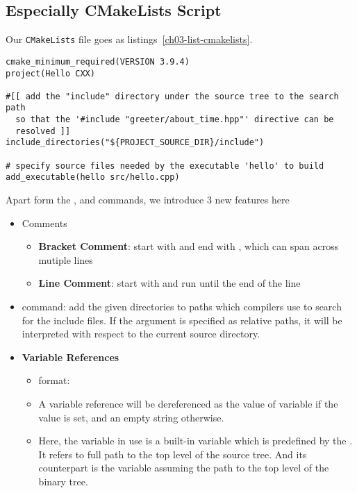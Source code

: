 \subsection{Especially CMakeLists Script}
Our \texttt{CMakeLists} file goes as listings~\ref{ch03-list-cmakelists}.\par
\begin{lstlisting}[caption={Codes for \texttt{CMakeLists.txt}},label=ch03-list-cmakelists]
cmake_minimum_required(VERSION 3.9.4)
project(Hello CXX)

#[[ add the "include" directory under the source tree to the search path
  so that the '#include "greeter/about_time.hpp"' directive can be
  resolved ]]
include_directories("${PROJECT_SOURCE_DIR}/include")

# specify source files needed by the executable 'hello' to build
add_executable(hello src/hello.cpp)
\end{lstlisting}
Apart form the ,  and  commands, we introduce 3 new features here
\begin{itemize}
	\item Comments
    \begin{itemize}
      \item \textbf{Bracket Comment}: start with \mkeyword{#[[} and end with \mkeyword{]]}, which can span across mutiple lines
      \item \textbf{Line Comment}: start with \mkeyword{#} and run until the end of the line
    \end{itemize}
  \item {} command: add the given directories to paths which compilers use to search for the include files. If the argument is specified as relative paths, it will be interpreted with respect to the current source directory.
  \item \textbf{Variable References}
    \begin{itemize}
      \item format: 
      \item A variable reference will be dereferenced as the value of variable if the value is set, and an empty string otherwise.
      \item Here, the variable in use is a built-in variable  which is predefined by the . It refers to full path to the top level of the source tree. And its counterpart is the  variable assuming the path to the top level of the binary tree.  
    \end{itemize}
\end{itemize}
